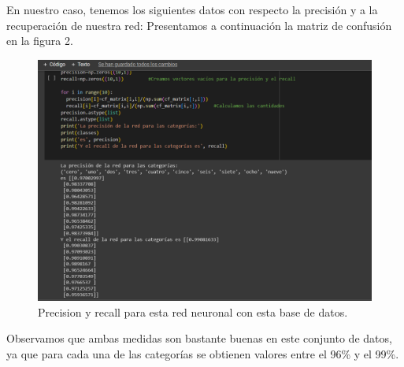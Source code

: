 \documentclass[letterpaper]{article}
\newcommand{\1}{\mathds{1}}
\theoremstyle{definition}
\theoremstyle{definition}
\theoremstyle{definition}
\theoremstyle{definition}
\theoremstyle{definition}
\begin{document}
\begin{itemize}
\begin{itemize}
    En nuestro caso, tenemos los siguientes datos con respecto la precisión y a la recuperación de nuestra red:
    Presentamos a continuación la matriz de confusión en la figura 2.
    \begin{figure}[h!]
        \centering
        \includegraphics[width=0.8\linewidth]{3.png}
        \caption{Precision y recall para esta red neuronal con esta base de datos.}
    \end{figure} 
    \end{itemize}
    Observamos que ambas medidas son bastante buenas en este conjunto de datos, ya que 
    para cada una de las categorías se obtienen valores entre el 96\% y el 99\%.
\end{itemize}
\end{document}
